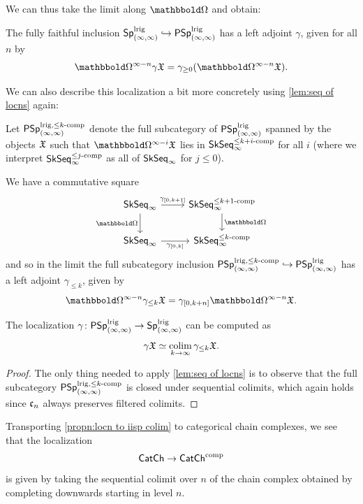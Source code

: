 \documentclass[a4paper,11pt]{article}
\begin{document}
We can thus take the limit along $\mOm$ and obtain:
\begin{cornoproof}\label{cor:gamma psp geq 0}
  The fully faithful inclusion $\SpIIl \hookrightarrow \PSpIIl$ has a
  left adjoint $\gamma$, given for all $n$ by
  \[ \mOm^{\infty-n}\gamma\spX = \gamma_{\geq
      0}(\mOm^{\infty-n}\spX). \qedhere\]
\end{cornoproof}

We can also describe this localization a bit more concretely using
\cref{lem:seq of locns} again:
\begin{defn}
  Let $\PSpIIlcl{k}$ denote the full subcategory of $\PSpIIl$ spanned
  by the objects $\spX$ such that $\mOm^{\infty-i}\spX$ lies in
  $\SkSeqIcl{k+i}$ for all $i$ (where we interpret $\SkSeqIcl{j}$ as
  all of $\SkSeqI$ for $j \leq 0$).
\end{defn}

\begin{observation}
  We have a commutative square
  \[
    \begin{tikzcd}
     \SkSeqI \ar[r, "\gamma_{[0,k+1]}"] \ar[d, "\mOm"'] & \SkSeqIcl{k+1}  \ar[d, "\mOm"] \\
     \SkSeqI \ar[r, "\gamma_{[0,k]}"'] & \SkSeqIcl{k}
    \end{tikzcd}
  \]
  and so in the limit the full subcategory inclusion $\PSpIIlcl{k}
  \hookrightarrow \PSpIIl$ has a left adjoint $\gamma_{\leq k}$, given
  by
  \[ \mOm^{\infty-n}\gamma_{\leq k}\spX = \gamma_{[0,k+n]} \mOm^{\infty-n}\spX.\]
\end{observation}

\begin{propn}\label{propn:locn to iisp colim}
  The localization $\gamma \colon \PSpIIl \to \SpIIl$ can be computed
  as
  \[ \gamma \spX \simeq \colimP_{k \rightarrow \infty} \gamma_{\leq k}\spX.\]
\end{propn}
\begin{proof}
  The only thing needed to apply \cref{lem:seq of locns} is to observe
  that the full subcategory $\PSpIIlcl{k}$ is closed under sequential
  colimits, which again holds since $\core[n]$ always preserves
  filtered colimits.
\end{proof}

\begin{observation}
  Transporting \cref{propn:locn to iisp colim} to
  categorical chain complexes, we see that the localization
  \[ \CCh \to \CChc\]
  is given by taking the sequential colimit over $n$ of the chain complex obtained
  by completing downwards starting in level $n$.
\end{observation}
\end{document}
